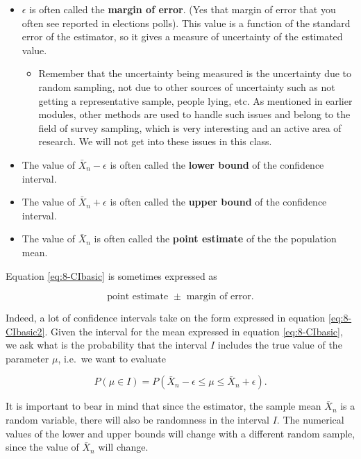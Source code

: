 \documentclass[
]{book}
\providecommand{\tightlist}{%
  \setlength{\itemsep}{0pt}\setlength{\parskip}{0pt}}
\begin{document}
\begin{itemize}
\item
  \(\epsilon\) is often called the \textbf{margin of error}. (Yes that margin of error that you often see reported in elections polls). This value is a function of the standard error of the estimator, so it gives a measure of uncertainty of the estimated value.

  \begin{itemize}
  \tightlist
  \item
    Remember that the uncertainty being measured is the uncertainty due to random sampling, not due to other sources of uncertainty such as not getting a representative sample, people lying, etc. As mentioned in earlier modules, other methods are used to handle such issues and belong to the field of survey sampling, which is very interesting and an active area of research. We will not get into these issues in this class.
  \end{itemize}
\item
  The value of \(\bar{X}_n - \epsilon\) is often called the \textbf{lower bound} of the confidence interval.
\item
  The value of \(\bar{X}_n + \epsilon\) is often called the \textbf{upper bound} of the confidence interval.
\item
  The value of \(\bar{X}_n\) is often called the \textbf{point estimate} of the the population mean.
\end{itemize}

Equation \eqref{eq:8-CIbasic} is sometimes expressed as

\begin{equation} 
\text{point estimate } \pm \text{ margin of error}.
\label{eq:8-CIbasic2}
\end{equation}

Indeed, a lot of confidence intervals take on the form expressed in equation \eqref{eq:8-CIbasic2}. Given the interval for the mean expressed in equation \eqref{eq:8-CIbasic}, we ask what is the probability that the interval \(I\) includes the true value of the parameter \(\mu\), i.e.~we want to evaluate

\begin{equation} 
P(\mu \in  I) = P(\bar{X}_n - \epsilon \leq \mu \leq \bar{X}_n + \epsilon).
\label{eq:8-CIprob}
\end{equation}

It is important to bear in mind that since the estimator, the sample mean \(\bar{X}_n\) is a random variable, there will also be randomness in the interval \(I\). The numerical values of the lower and upper bounds will change with a different random sample, since the value of \(\bar{X}_n\) will change.
\end{document}
